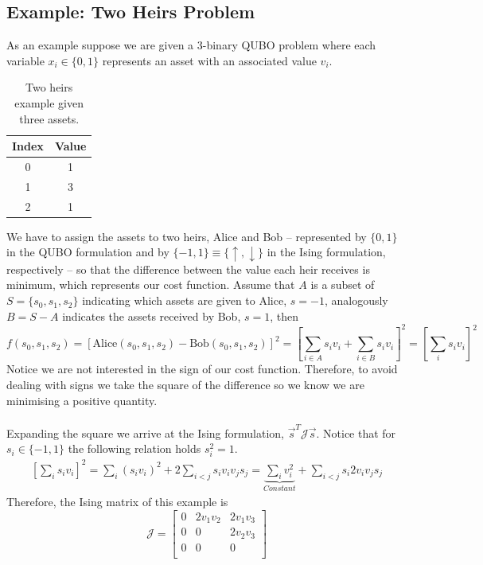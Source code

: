 \subsection{Example: Two Heirs Problem}
 As an example suppose we are given a 3-binary QUBO problem where each variable $x_{i} \in \{0,1\}$ represents an asset with an associated value $v_{i}$.
\begin{table}[H]
\centering
\label{tab:Assets}
\begin{tabular}{ |c || c| }
  \hline			
  \textbf{Index} & \textbf{Value}  \\
    \hline		
   0 & 1\\
       \hline		
   1 & 3\\
       \hline		
   2 & 1\\
        \hline	
\end{tabular}
\caption{Two heirs example given three assets.}
\end{table}
We have to assign the assets to two heirs, Alice and Bob -- represented by $\{0,1\}$ in the QUBO formulation and by $\{-1,1\}\equiv \{\uparrow, \downarrow\}$ in the Ising formulation, respectively -- so that the difference between the value each heir receives is minimum, which represents our cost function. Assume that $A$ is a subset of $S = \{s_{0},s_{1},s_{2}\}$ indicating which assets are given to Alice, $s=-1$, analogously  $B = S - A$ indicates the assets received by Bob, $s=1$, then
\begin{equation} 
    f(s_{0}, s_{1}, s_{2}) = \left[\text{Alice}(s_{0}, s_{1}, s_{2}) - \text{Bob}(s_{0}, s_{1}, s_{2})\right]^{2} = \left[\sum_{i\in A}s_{i}v_{i} + \sum_{i\in B}s_{i}v_{i}\right]^{2} = \left[\sum_{i}s_{i}v_{i}\right]^{2}
\end{equation}
Notice we are not interested in the sign of our cost function. Therefore, to avoid dealing with signs we take the square of the difference so we know we are minimising a positive quantity.\\\\
Expanding the square we arrive at the Ising formulation, $\vec{s}^{T}\mathcal{J}\vec{s}$. Notice that for $s_{i} \in \{-1,1\}$ the following relation holds $s_{i}^{2}=1$. 
\begin{align}
    \left[\sum_{i}s_{i}v_{i}\right]^{2} = \sum_{i}\left(s_{i}v_{i}\right)^{2} + 2\sum_{i<j}s_{i}v_{i}v_{j}s_{j} = \underbrace{\sum_{i}v_{i}^{2}}_{Constant} + \sum_{i<j}s_{i}2v_{i}v_{j}s_{j}
\end{align}
Therefore, the Ising matrix of this example is
\begin{equation}
\mathcal{J}= 
    \begin{bmatrix}
           0 & 2v_{1}v_{2} & 2v_{1}v_{3}\\
           0 & 0 & 2v_{2}v_{3}\\
           0& 0 & 0\\
         \end{bmatrix}
\end{equation}
